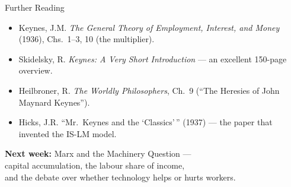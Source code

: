 \documentclass[aspectratio=169, 10pt]{beamer}
\begin{document}
\begin{frame}{Further Reading}
\begin{itemize}
  \item Keynes, J.M. \textit{The General Theory of Employment, Interest, and
        Money} (1936), Chs.~1--3, 10 (the multiplier).
  \item Skidelsky, R. \textit{Keynes: A Very Short Introduction} ---
        an excellent 150-page overview.
  \item Heilbroner, R. \textit{The Worldly Philosophers}, Ch.~9
        (``The Heresies of John Maynard Keynes'').
  \item Hicks, J.R. ``Mr.\ Keynes and the `Classics'\,'' (1937) ---
        the paper that invented the IS-LM model.
\end{itemize}
\vspace{1em}
\begin{center}
\textbf{Next week:} Marx and the Machinery Question ---\\
capital accumulation, the labour share of income,\\
and the debate over whether technology helps or hurts workers.
\end{center}
\end{frame}
\end{document}
